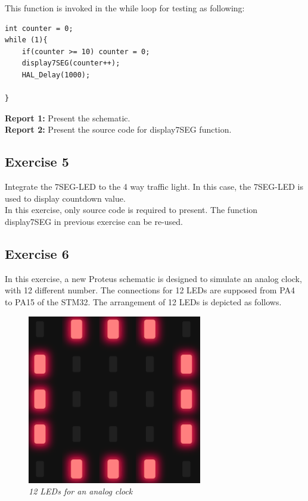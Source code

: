 \newpage
This function is invoked in the while loop for testing as following:
\begin{lstlisting}[caption=An example for your source code]
int counter = 0;
while (1){
    if(counter >= 10) counter = 0;    
    display7SEG(counter++);
    HAL_Delay(1000);

}
\end{lstlisting}

\textbf{Report 1: } Present the schematic.\\

\textbf{Report 2: } Present the source code for display7SEG function.

\subsection{Exercise 5}
Integrate the 7SEG-LED to the 4 way traffic light. In this case, the 7SEG-LED is used to display countdown value.\\

In this exercise, only source code is required to present. The function display7SEG in previous exercise can be re-used.

\subsection{Exercise 6}
In this exercise, a new Proteus schematic is designed to simulate an analog clock, with 12 different number. The connections for 12 LEDs are supposed from PA4 to PA15 of the STM32. The arrangement of 12 LEDs is depicted as follows.

\begin{figure}[!htp]
    \centering
    \includegraphics[width=3in]{source/picture/bai_1/pic4.PNG}
    \caption{\textit{12 LEDs for an analog clock}}
    \label{bai1_pic3}
\end{figure}

